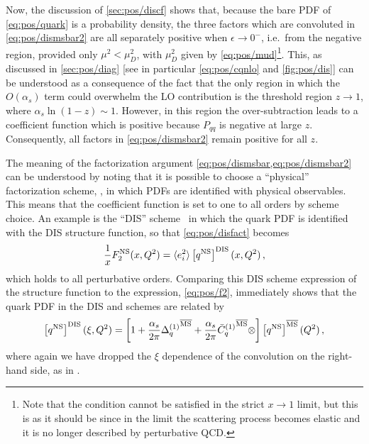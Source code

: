 Now, the discussion of \cref{sec:pos/discf} shows that, because the
bare PDF of \cref{eq:pos/quark} is a probability density, the three
factors which are convoluted in \cref{eq:pos/dismsbar2} are all
separately positive when $\epsilon \to 0^-$, i.e.\ from the negative
region, provided only $\mu^2< \mu_D^2$, with $\mu_D^2$ given by
\cref{eq:pos/mud}\footnote{Note that the condition cannot be satisfied in
the strict $x\to1$ limit, but this is as it should be since in the
limit the scattering process becomes elastic and it is no longer
described by perturbative QCD.}.
This, as discussed in \cref{sec:pos/diag} [see in particular \cref{eq:pos/cqnlo}
and \cref{fig:pos/dis}] can be understood as a consequence of the fact that the
only region in which the $O(\alpha_s)$ term could overwhelm the LO contribution
is the threshold region $z\to 1$, where $\alpha_s\ln(1-z)\sim1$.
However, in this region the \msbar{} over-subtraction leads to a
coefficient function which is positive because $P_{qq}$ is negative at
large $z$.
Consequently, all factors in \cref{eq:pos/dismsbar2} remain positive for all
$z$.

The  meaning of the factorization argument
\cref{eq:pos/dismsbar,eq:pos/dismsbar2} can be understood by noting that it is
possible to choose a \enquote{physical} factorization scheme,
\cite{Catani:1995ze}, in which PDFs are identified with physical observables.
This means that the coefficient function is set to one to all orders by scheme
choice.
An example is the ``DIS'' scheme~\cite{Diemoz:1987xu} in which the quark PDF is
identified with the DIS structure function, so that \cref{eq:pos/disfact}
becomes
\begin{equation}\label{eq:pos/disfactns}
 \frac{1}{x} F_2^{{\textrm{NS}}}(x,Q^2)= \langle e_i^2\rangle  \left[{q^{{\textrm{NS}}}}\right]^{\textrm{DIS}}(x,Q^2) \,,
 \end{equation}
which holds to all perturbative orders. Comparing this DIS scheme
expression of the structure function to the \msbar{} expression,
\cref{eq:pos/f2}, immediately shows that the quark PDF in the DIS
and \msbar{} schemes are related by
\begin{equation}\label{eq:pos/msbartodis}
\left[{q^{{\textrm{NS}}}}\right]^{\textrm{DIS}}(\xi,Q^2)=
\left[1+\frac{\alpha_s}{2\pi} {\Delta^{(1)}_q}^{{\overline{\textrm{MS}}}}
  +\frac{\alpha_s}{2\pi}
  {{{\bar{C}}^{(1)}}_q{}}^{{\overline{\textrm{MS}}}}\otimes\right]\left[{q^{{\textrm{NS}}}}\right]^{{\overline{\textrm{MS}}}}(Q^2) \,,
\end{equation}
where again we have dropped the $\xi$ dependence of the convolution
on the right-hand side,
as in .


